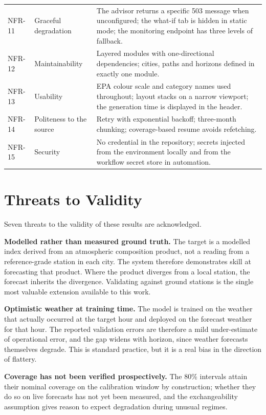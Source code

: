 \begin{xltabular}{\textwidth}{Q{1.5cm} P{3.4cm} Y}
NFR-11 & Graceful degradation & The advisor returns a specific 503 message when
unconfigured; the what-if tab is hidden in static mode; the monitoring endpoint
has three levels of fallback. \\
NFR-12 & Maintainability & Layered modules with one-directional dependencies;
cities, paths and horizons defined in exactly one module. \\
NFR-13 & Usability & EPA colour scale and category names used throughout; layout
stacks on a narrow viewport; the generation time is displayed in the header. \\
NFR-14 & Politeness to the source & Retry with exponential backoff; three-month
chunking; coverage-based resume avoids refetching. \\
NFR-15 & Security & No credential in the repository; secrets injected from the
environment locally and from the workflow secret store in automation. \\
\end{xltabular}

\section{Threats to Validity}
\label{sec:testing-threats}
Seven threats to the validity of these results are acknowledged.

\textbf{Modelled rather than measured ground truth.} The target is a modelled
index derived from an atmospheric composition product, not a reading from a
reference-grade station in each city. The system therefore demonstrates skill at
forecasting that product. Where the product diverges from a local station, the
forecast inherits the divergence. Validating against ground stations is the single
most valuable extension available to this work.

\textbf{Optimistic weather at training time.} The model is trained on the weather
that actually occurred at the target hour and deployed on the forecast weather for
that hour. The reported validation errors are therefore a mild under-estimate of
operational error, and the gap widens with horizon, since weather forecasts
themselves degrade. This is standard practice, but it is a real bias in the
direction of flattery.

\textbf{Coverage has not been verified prospectively.} The 80\% intervals attain
their nominal coverage on the calibration window by construction; whether they do
so on live forecasts has not yet been measured, and the exchangeability assumption
gives reason to expect degradation during unusual regimes.

